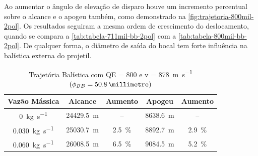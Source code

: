 Ao aumentar o ângulo de elevação de disparo houve um incremento percentual sobre o alcance e o apogeu também, como demonstrado na \autoref{fig:trajetoria-800mil-2pol}. Os resultados seguiram a mesma ordem de crescimento do deslocamento, quando se compara a \autoref{tab:tabela-711mil-bb-2pol} com a \autoref{tab:tabela-800mil-bb-2pol}. De qualquer forma, o diâmetro de saída do bocal tem forte influência na balística externa do projetil.

\begin{table}[ht]
\centering
\caption[Trajetória Balística com QE = \qty{800}{\milliradian} e v = \qty{878}{\metre\per\second} \(\left(\phi_{BB} = \qty{50,8}{\millimetre}\right)\)]{Trajetória Balística com QE = \qty{800}{\milliradian} e v = \qty[per-mode =symbol]{878}{\metre\per\second} \(\left(\phi_{BB} = \qty{50,8}{\millimetre}\right)\)}
\vspace{0.5cm}
\begin{tabular}{c|c|c|c|c}
Vazão Mássica & Alcance & Aumento & Apogeu & Aumento \\
\hline
\qty{0}{\kilogram\per\second} & \qty{24429,5}{\metre} & -- & \qty{8638,6}{\metre} & -- \\ 
\qty{0,030}{\kilogram\per\second} & \qty{25030,7}{\metre} & \qty{2,5}{\percent} & \qty{8892,7}{\metre} & \qty{2,9}{\percent} \\
\qty{0,060}{\kilogram\per\second} & \qty{26008,5}{\metre} & \qty{6,5}{\percent} & \qty{9084,5}{\metre} & \qty{5,2}{\percent}
\end{tabular}
\label{tab:tabela-800mil-bb-2pol}
\end{table}